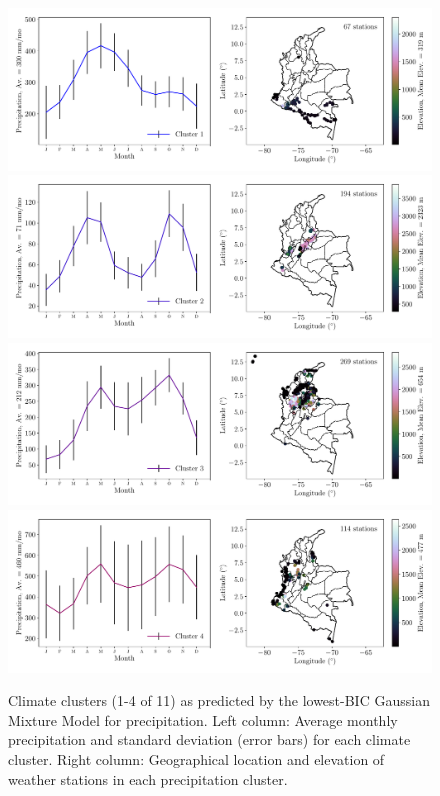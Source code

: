 \documentclass[a4paper,fleqn,usenatbib]{mnras}
\begin{document}
\begin{figure}
\begin{center}
\includegraphics[scale=0.5,trim={0 17 0 18},clip]{gmml0.pdf}
\includegraphics[scale=0.5,trim={0 17 0 18},clip]{gmml1.pdf}
\includegraphics[scale=0.5,trim={0 17 0 18},clip]{gmml2.pdf}
\includegraphics[scale=0.5,trim={0 17 0 18},clip]{gmml3.pdf}
\caption{Climate clusters (1-4 of 11) as predicted by the lowest-BIC Gaussian Mixture Model for precipitation. Left column: Average monthly precipitation and standard deviation (error bars) for each climate cluster. Right column: Geographical location and elevation of weather stations in each precipitation cluster.}\label{clustl}
\end{center}
\end{figure}
\end{document}
